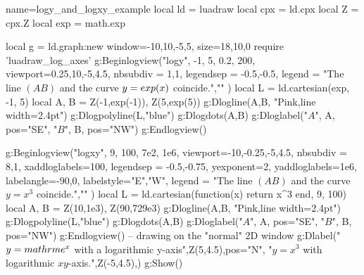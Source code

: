 \begin{luadraw}{name=logy_and_logxy_example}
local ld = luadraw
local cpx = ld.cpx
local Z = cpx.Z
local  exp = math.exp

local g = ld.graph:new{ window={-10,10,-5,5}, size={18,10,0} }
require 'luadraw_log_axes'
g:Beginlogview("logy", -1, 5, 0.2, 200, { viewport={0.25,10,-5,4.5},
    nbsubdiv = {1,1},
    legendsep = {-0.5,-0.5},
    legend = {"The line $(AB)$ and the curve $y=\\exp(x)$ coincide.",""}
})
local L = ld.cartesian(exp, -1, 5)
local A, B = Z(-1,exp(-1)), Z(5,exp(5))
g:Dlogline(A,B, "Pink,line width=2.4pt")
g:Dlogpolyline(L,"blue") 
g:Dlogdots({A,B})
g:Dloglabel("$A$", A, {pos="SE"}, "$B$", B, {pos="NW"})
g:Endlogview()

g:Beginlogview("logxy", 9, 100, 7e2, 1e6, { viewport={-10,-0.25,-5,4.5},
    nbsubdiv = {8,1},
    xaddloglabels={100},
    legendsep = {-0.5,-0.75},
    yexponent=2,
    yaddloglabels={1e6}, 
    labelangle={-90,0}, labelstyle={"E","W"},
    legend = {"The line $(AB)$ and the curve $y=x^3$ coincide.",""}
})
local L = ld.cartesian(function(x) return x^3 end, 9, 100)
local A, B = Z(10,1e3), Z(90,729e3)
g:Dlogline(A,B, "Pink,line width=2.4pt")
g:Dlogpolyline(L,"blue") 
g:Dlogdots({A,B})
g:Dloglabel("$A$", A, {pos="SE"}, "$B$", B, {pos="NW"})
g:Endlogview()
-- drawing on the "normal" 2D window
g:Dlabel("$y=\\mathrm{e}^x$ with a logarithmic y-axis",Z(5,4.5),{pos="N"},
  "$y=x^3$ with logarithmic $xy$-axis.",Z(-5,4.5),{})
g:Show()
\end{luadraw}
